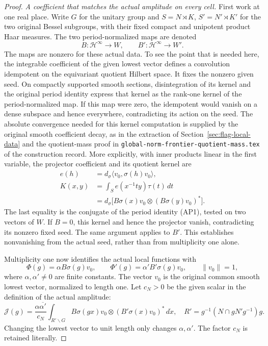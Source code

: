 \begin{proof}
\emph{A coefficient that matches the actual amplitude
on every cell.}
First work at one real place. Write \(G\) for the
unitary group and \(S=N\rtimes K\), \(S'=N'\rtimes K'\)
for the two original Bessel subgroups, with their fixed
compact and unipotent product Haar measures. The two
period-normalized maps are denoted
\[
 B:\mathcal H^\infty\longrightarrow W,\qquad
 B':\mathcal H^\infty\longrightarrow W'.
\]
The maps are nonzero for these actual data. To see the
point that is needed here, the integrable coefficient
of the given lowest vector defines a convolution
idempotent on the equivariant quotient Hilbert space.
It fixes the nonzero given seed. On compactly supported
smooth sections, disintegration of its kernel and the
original period identity express that kernel as the
rank-one kernel of the period-normalized map. If this
map were zero, the idempotent would vanish on a dense
subspace and hence everywhere, contradicting its action
on the seed. The absolute convergence needed for this
kernel computation is supplied by the original smooth
coefficient decay, as in the extraction of
Section~\ref{sec:flag-local-data} and the quotient-mass
proof in \texttt{global-norm-frontier-quotient-mass.tex}
of the construction record.\cite{current-construction-record}
More explicitly, with inner products linear in the first variable,
the projector coefficient and its quotient kernel are
\[
 \begin{split}
 e(h)&=d_\sigma\langle v_0,\sigma(h)v_0\rangle,\\
 K(x,y)&=\int_S e(x^{-1}ty)\tau(t)\,dt\\
       &=d_\sigma\bigl[B\sigma(x)v_0
                              \otimes(B\sigma(y)v_0)^*\bigr].
 \end{split}
\]
The last equality is the conjugate of the period identity (AP1),
tested on two vectors of \(W\). If \(B=0\), this kernel and hence
the projector vanish, contradicting its nonzero fixed seed.
The same argument applies to \(B'\). This establishes
nonvanishing from the actual seed, rather than from
multiplicity one alone.

Multiplicity one now identifies the actual local
functions with
\[
 \Phi(g)=\alpha B\sigma(g)v_0,\qquad
 \Phi'(g)=\alpha'B'\sigma(g)v_0,
 \qquad \|v_0\|=1,
                                                        \tag{EN3}
\]
where \(\alpha,\alpha'\ne0\) are finite constants.
The vector \(v_0\) is the original common smooth lowest
vector, normalized to length one. Let \(c_N>0\) be the
given scalar in the definition of the actual amplitude:
\[
 \mathcal J(g)=\frac{\alpha\overline{\alpha'}}{c_N}
       \int_{R'\backslash G}
       B\sigma(gx)v_0\otimes(B'\sigma(x)v_0)^*
                    \,d\dot x ,
 \quad R'=g^{-1}(N\cap gN'g^{-1})g .
                                                        \tag{EN4}
\]
Changing the lowest vector to unit length only changes
\(\alpha,\alpha'\). The factor \(c_N\) is retained
literally.


\end{proof}
